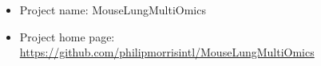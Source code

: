 \begin{itemize}
    \item Project name: MouseLungMultiOmics
    \item Project home page: \url{https://github.com/philipmorrisintl/MouseLungMultiOmics}
\end{itemize}